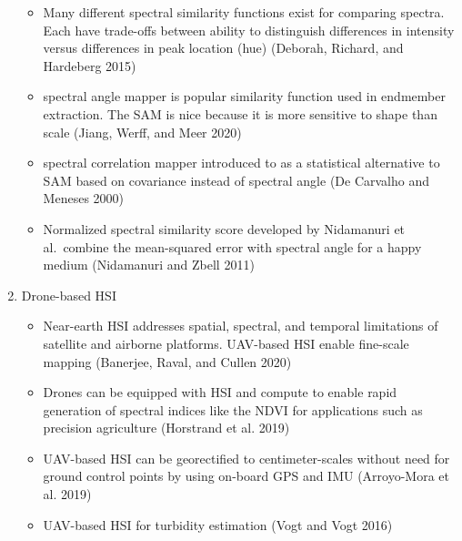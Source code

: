 \documentclass[
  letterpaper,
  DIV=11,
  numbers=noendperiod]{scrartcl}
\providecommand{\tightlist}{%
  \setlength{\itemsep}{0pt}\setlength{\parskip}{0pt}}\usepackage{longtable,booktabs,array}
\begin{document}
\begin{enumerate}
  \begin{itemize}
  \tightlist
  \item
    Many different spectral similarity functions exist for comparing
    spectra. Each have trade-offs between ability to distinguish
    differences in intensity versus differences in peak location (hue)
    (Deborah, Richard, and Hardeberg 2015)
  \item
    spectral angle mapper is popular similarity function used in
    endmember extraction. The SAM is nice because it is more sensitive
    to shape than scale (Jiang, Werff, and Meer 2020)
  \item
    spectral correlation mapper introduced to as a statistical
    alternative to SAM based on covariance instead of spectral angle (De
    Carvalho and Meneses 2000)
  \item
    Normalized spectral similarity score developed by Nidamanuri et
    al.~combine the mean-squared error with spectral angle for a happy
    medium (Nidamanuri and Zbell 2011)
  \end{itemize}
\item
  Drone-based HSI

  \begin{itemize}
  \tightlist
  \item
    Near-earth HSI addresses spatial, spectral, and temporal limitations
    of satellite and airborne platforms. UAV-based HSI enable fine-scale
    mapping (Banerjee, Raval, and Cullen 2020)
  \item
    Drones can be equipped with HSI and compute to enable rapid
    generation of spectral indices like the NDVI for applications such
    as precision agriculture (Horstrand et al. 2019)
  \item
    UAV-based HSI can be georectified to centimeter-scales without need
    for ground control points by using on-board GPS and IMU (Arroyo-Mora
    et al. 2019)
  \item
    UAV-based HSI for turbidity estimation (Vogt and Vogt 2016)
  \end{itemize}
\end{enumerate}
\end{document}
